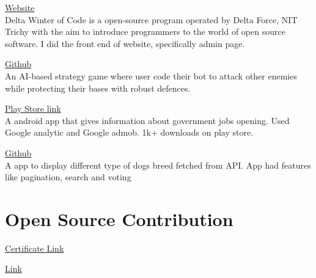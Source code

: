 \documentclass[]{deedy-resume-openfont}
\begin{document}
\begin{minipage}[t]{0.69\textwidth}
\hfill \href{http://dwoc.io}{Website}\\
Delta Winter of Code is a open-source program operated by Delta Force, NIT Trichy with the aim to introduce programmers to the world of open source software.
I did the front end of website, specifically admin page.\\
\sectionsep

\hfill \href{https://github.com/delta/codecharacter-web-2022}{Github}\\
An AI-based strategy game where user code their bot to attack other enemies while protecting their bases with robust defences.\\
\sectionsep

\hfill \href{https://play.google.com/store/apps/details?id=com.amostrone.akash.sanjeevwebsolutions}{Play Store link}\\
A android app that gives information about government jobs opening. Used Google analytic and Google admob. 1k+ downloads on play store.\\
\sectionsep

\hfill \href{https://github.com/jaiakash/Pawsome}{Github}\\
A app to display different type of dogs breed fetched from API. App had features like pagination, search and voting\\
\sectionsep

%
%

\section{Open Source Contribution}
\href{https://kossiitkgp.org/public-files/KWoC/2021-Certificates/Student/jaiakash.pdf
}{Certificate Link}


\href{https://github.com/interviewstreet/ghs/pull/5
}{Link}

%
%

\end{minipage}
\end{document}
